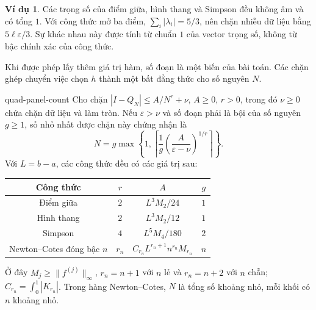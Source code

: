 \documentclass[12pt,a4paper,oneside]{book}
\numberwithin{algorithm}{chapter}
\theoremstyle{definition}
\newtheorem{vidu}{Ví dụ}[chapter]
\begin{document}
\begin{vidu}
Các trọng số của điểm giữa, hình thang và Simpson đều không âm và có tổng $1$. Với công thức mở ba điểm, $\sum_i|\lambda_i|=5/3$, nên chặn nhiễu dữ liệu bằng $5\ell\varepsilon/3$. Sự khác nhau này được tính từ chuẩn $1$ của vector trọng số, không từ bậc chính xác của công thức.
\end{vidu}

Khi được phép lấy thêm giá trị hàm, số đoạn là một biến của bài toán. Các chặn ghép chuyển việc chọn $h$ thành một bất đẳng thức cho số nguyên $N$.

\begin{menhde}{}{quad-panel-count}
Cho chặn $|I-Q_N|\leq A/N^r+\nu$, $A\geq0$, $r>0$, trong đó $\nu\geq0$ chứa chặn dữ liệu và làm tròn. Nếu $\varepsilon>\nu$ và số đoạn phải là bội của số nguyên $g\geq1$, số nhỏ nhất được chặn này chứng nhận là
\begin{equation}\label{eq:quad-panel-count}
 N=g\max\left\{1,\left\lceil\frac1g\left(\frac A{\varepsilon-\nu}\right)^{1/r}\right\rceil\right\}.
\end{equation}
Với $L=b-a$, các công thức đều có các giá trị sau:
\begin{center}
\begin{tabular}{c|c|c|c}
\toprule
Công thức & $r$ & $A$ & $g$\\
\midrule
Điểm giữa & $2$ & $L^3M_2/24$ & $1$\\
Hình thang & $2$ & $L^3M_2/12$ & $1$\\
Simpson & $4$ & $L^5M_4/180$ & $2$\\
Newton--Cotes đóng bậc $n$ & $r_n$ & $C_{r_n}L^{r_n+1}n^{r_n}M_{r_n}$ & $n$\\
\bottomrule
\end{tabular}\end{center}
Ở đây $M_j\geq\|f^{(j)}\|_\infty$, $r_n=n+1$ với $n$ lẻ và $r_n=n+2$ với $n$ chẵn; $C_{r_n}=\int_0^1|K_{r_n}|$. Trong hàng Newton--Cotes, $N$ là tổng số khoảng nhỏ, mỗi khối có $n$ khoảng nhỏ.
\end{menhde}
\end{document}

